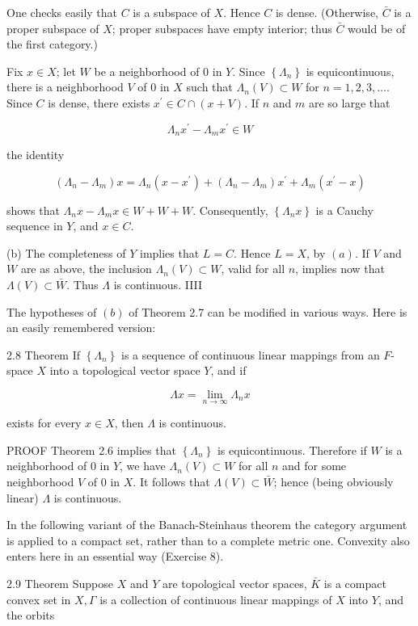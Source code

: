 \documentclass[10pt]{article}
\begin{document}
One checks easily that $C$ is a subspace of $X$. Hence $C$ is dense. (Otherwise, $\bar{C}$ is a proper subspace of $X$; proper subspaces have empty interior; thus $\bar{C}$ would be of the first category.)

Fix $x \in X$; let $W$ be a neighborhood of 0 in $Y$. Since $\left\{\Lambda_{n}\right\}$ is equicontinuous, there is a neighborhood $V$ of 0 in $X$ such that $\Lambda_{n}(V) \subset W$ for $n=1,2,3, \ldots$. Since $C$ is dense, there exists $x^{\prime} \in C \cap(x+V)$. If $n$ and $m$ are so large that

$$
\Lambda_{n} x^{\prime}-\Lambda_{m} x^{\prime} \in W
$$

the identity

$$
\left(\Lambda_{n}-\Lambda_{m}\right) x=\Lambda_{n}\left(x-x^{\prime}\right)+\left(\Lambda_{n}-\Lambda_{m}\right) x^{\prime}+\Lambda_{m}\left(x^{\prime}-x\right)
$$

shows that $\Lambda_{n} x-\Lambda_{m} x \in W+W+W$. Consequently, $\left\{\Lambda_{n} x\right\}$ is a Cauchy
sequence in $Y$, and $x \in C$.

(b) The completeness of $Y$ implies that $L=C$. Hence $L=X$, by $(a)$. If $V$ and $W$ are as above, the inclusion $\Lambda_{n}(V) \subset W$, valid for all $n$, implies now that $\Lambda(V) \subset \bar{W}$. Thus $\Lambda$ is continuous. IIII

The hypotheses of $(b)$ of Theorem 2.7 can be modified in various ways. Here is an easily remembered version:

2.8 Theorem If $\left\{\Lambda_{n}\right\}$ is a sequence of continuous linear mappings from an $F$-space $X$ into a topological vector space $Y$, and if

$$
\Lambda x=\lim _{n \rightarrow \infty} \Lambda_{n} x
$$

exists for every $x \in X$, then $\Lambda$ is continuous.

PROOF Theorem 2.6 implies that $\left\{\Lambda_{n}\right\}$ is equicontinuous. Therefore if $W$ is a neighborhood of 0 in $Y$, we have $\Lambda_{n}(V) \subset W$ for all $n$ and for some neighborhood $V$ of 0 in $X$. It follows that $\Lambda(V) \subset \bar{W}$; hence (being obviously linear) $\Lambda$ is
continuous.

In the following variant of the Banach-Steinhaus theorem the category argument is applied to a compact set, rather than to a complete metric one. Convexity also enters here in an essential way (Exercise 8).

2.9 Theorem Suppose $X$ and $Y$ are topological vector spaces, $\bar{K}$ is a compact convex set in $X, \Gamma$ is a collection of continuous linear mappings of $X$ into $Y$, and the orbits
\end{document}
